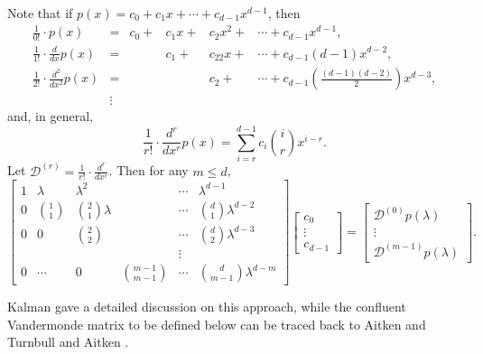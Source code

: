 \documentclass{article}
\theoremstyle{definition}
\begin{document}
Note that if $p(x) = c_0 + c_1 x + \cdots + c_{d-1} x^{d-1}$, then
\[
    \begin{array}{lcrrrr}
        \frac{1}{0!}\cdot p(x) &= & c_0 +& c_1x +& c_2x^2 +& \cdots + c_{d-1}x^{d-1}, \\
        \frac{1}{1!}\cdot\frac{d}{dx}p(x) &= & & c_1 +& c_22x +& \cdots + c_{d-1}(d-1)x^{d-2}, \\
        \frac{1}{2!}\cdot\frac{d^2}{dx^2}p(x) &= & & & c_2 +& \cdots + c_{d-1}\left(\frac{(d-1)(d-2)}{2}\right)x^{d-3}, \\
        & \vdots &&&&
    \end{array}
\]
and, in general,
\[
    \frac{1}{r!}\cdot \frac{d^r}{dx^r} p(x) = 
    \sum_{i = r}^{d-1} c_i\binom{i}{r}x^{i-r}.
\]
Let $\mathcal{D}^{(r)} = \frac{1}{r!}\cdot \frac{d^r}{dx^r}$.  Then for any  $m \le d$,
\begin{equation}
\label{eqn:solve-der}
    \begin{bmatrix}
        1 & \lambda & \lambda^2 & ~ & \cdots & \lambda^{d-1} \\
        0 & \binom{1}{1} & \binom{2}{1}\lambda & ~ & \cdots & \binom{d}{1}\lambda^{d-2} \\
        0 & 0 & \binom{2}{2} & ~ & \cdots & \binom{d}{2}\lambda^{d-3} \\
        ~ & ~ & ~ & ~ & \vdots & ~ \\
        0 & \cdots & 0 & \binom{m-1}{m-1} & \cdots & \binom{d}{m-1}\lambda^{d-m}
    \end{bmatrix}
    \begin{bmatrix} c_0 \\ \vdots \\ c_{d-1} \end{bmatrix} 
    = 
    \begin{bmatrix} \mathcal{D}^{(0)}p(\lambda) \\ \vdots \\ \mathcal{D}^{(m-1)}p(\lambda) \end{bmatrix}.
\end{equation}

Kalman \cite{Kalman84} gave a detailed discussion on this approach, while the confluent Vandermonde matrix to be defined below can be traced back to Aitken and Turnbull \cite{AT32} and Aitken \cite{Aitken39}.
\end{document}
